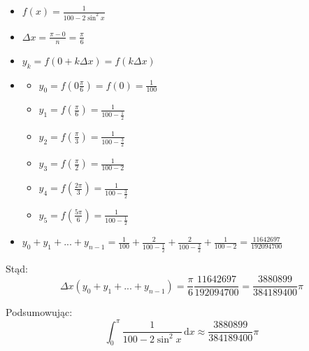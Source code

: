 \documentclass[12pt]{article}
\newcommand{\Integral}[4]{\int_{#1}^{#2} \! #3 \, \mathrm{d}#4}
\DeclareMathOperator{\?}{?}
\begin{document}
\begin{itemize}
    \item[] $ \displaystyle f(x) = \frac{1}{100 - 2 \sin^2{x}} $
    \item[] $ \displaystyle \Delta x = \frac{\pi - 0}{n} = \frac{\pi}{6} $
    \item[] $ y_k = f(0 + k \Delta x) = f(k \Delta x) $
    \item[]
        \begin{multicols}{2}
            \begin{itemize}
                \item[] $ \displaystyle y_0 = f(0 \frac{\pi}{6}) = f(0) = \frac{1}{100}$
                \item[] $ \displaystyle y_1 = f(\frac{\pi}{6}) = \frac{1}{100 - \frac{1}{2}} $
                \item[] $ \displaystyle y_2 = f(\frac{\pi}{3}) = \frac{1}{100 - \frac{3}{2}} $
                \item[] $ \displaystyle y_3 = f(\frac{\pi}{2}) = \frac{1}{100 - 2} $
                \item[] $ \displaystyle y_4 = f(\frac{2\pi}{3}) = \frac{1}{100 - \frac{3}{2}} $
                \item[] $ \displaystyle y_5 = f(\frac{5\pi}{6}) = \frac{1}{100 - \frac{1}{2}} $
            \end{itemize}
        \end{multicols}
    \item[] $ y_0 + y_1 + ... + y_{n-1} = \frac{1}{100} + \frac{2}{100-\frac{1}{2}} + \frac{2}{100-\frac{3}{2}} + \frac{1}{100-2} = \frac{11642697}{192094700} $
\end{itemize}

Stąd:
\begin{equation*}
    \Delta x (y_0 + y_1 + ... + y_{n-1}) = \frac{\pi}{6} \frac{11642697}{192094700} = \frac{3880899}{384189400}\pi
\end{equation*}

Podsumowując:
\begin{equation*}
    \Integral{0}{\pi}{\frac{1}{100 - 2 \sin^2{x}}}{x} \approx \frac{3880899}{384189400}\pi
\end{equation*}
\end{document}
